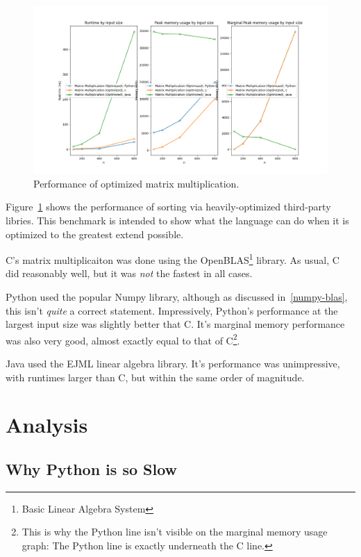 \documentclass[12pt,letterpaper]{article}
\begin{document}
\begin{figure}[H]
  \centering
  \includegraphics[width=\textwidth]{./matmul_optimized-plot.png}
  \caption{Performance of optimized matrix multiplication.}
  \label{plot-matmul-opt}
\end{figure}

Figure~\ref{plot-matmul-opt} shows the performance of sorting via
heavily-optimized third-party libries. This benchmark is intended to show what
the language can do when it is optimized to the greatest extend possible.

C's matrix multiplicaiton was done using the OpenBLAS\footnote{Basic Linear
Algebra System} library. As usual, C did reasonably well, but it was \emph{not}
the fastest in all cases.

Python used the popular Numpy library, although as discussed
in~\ref{numpy-blas}, this isn't \emph{quite} a correct statement. Impressively,
Python's performance at the largest input size was slightly better that C. It's
marginal memory performance was also very good, almost exactly equal to that of
C\footnote{This is why the Python line isn't visible on the marginal memory
usage graph: The Python line is exactly underneath the C line.}.

Java used the EJML linear algebra library. It's performance was unimpressive,
with runtimes larger than C, but within the same order of magnitude.

\section{Analysis}

\subsection{Why Python is so Slow}\label{python-slow}
\end{document}
